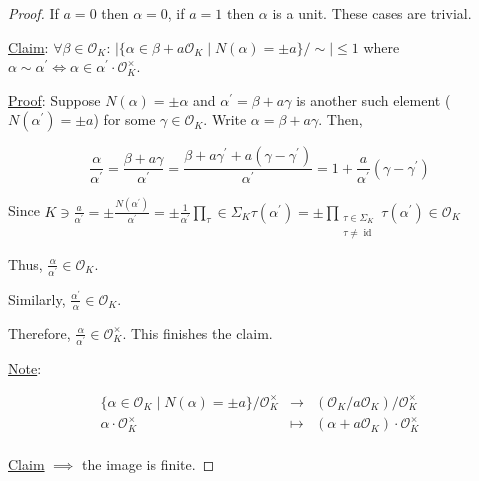 \documentclass[openany]{amsbook}
\numberwithin{section}{chapter}
\theoremstyle{definition}
\begin{document}
\begin{proof}
    If \(a = 0\) then \(\alpha = 0\), if \(a = 1\) then \(\alpha\) is a unit. These cases are trivial.

    \underline{Claim}: \(\forall \beta \in \mathcal{O}_K\): \(\left\vert \{ \alpha \in \beta + a \mathcal{O}_K \mid N(\alpha) = \pm a \} / \sim \right\vert \leq 1\) where \(\alpha \sim \alpha ^{\prime} \iff \alpha \in \alpha ^{\prime} \cdot \mathcal{O}_K^\times\). 

    \underline{Proof}: Suppose \(N(\alpha)=\pm \alpha\) and \(\alpha ^{\prime} = \beta + a \gamma \) is another such element (\(N(\alpha ^{\prime} ) = \pm a\)) for some \(\gamma \in \mathcal{O}_K\). Write \(\alpha = \beta + a \gamma\). Then, 
    
    \[
        \frac{\alpha}{\alpha ^{\prime}} = \frac{\beta + a \gamma}{\alpha ^{\prime} } = \frac{\beta + a \gamma ^{\prime} + a(\gamma -\gamma ^{\prime} )}{\alpha ^{\prime} } = 1 + \frac{a}{\alpha ^{\prime}} (\gamma - \gamma ^{\prime} )
    \]
    
    Since \(K\ni\frac{a}{\alpha ^{\prime} } = \pm \frac{N(\alpha^{\prime})}{\alpha ^{\prime}} = \pm \frac{1}{\alpha ^{\prime} } \prod_\tau \in \Sigma_K \tau(\alpha^{\prime}) = \pm \prod_{\substack{\tau \in \Sigma _K \\ \tau \neq \operatorname{id}}} \tau(\alpha ^{\prime}) \in \mathcal{O}_K\) 

    Thus, \(\frac{\alpha}{\alpha ^{\prime} } \in \mathcal{O}_K\).
    
    Similarly, \(\frac{\alpha^{\prime}}{\alpha} \in \mathcal{O}_K\).
    
    Therefore, \(\frac{\alpha}{\alpha^{\prime}} \in \mathcal{O}_K^\times\).  This finishes the claim.
    
    \underline{Note}:

    \[
        \begin{array}{rcl}
            \{ \alpha \in \mathcal{O}_K \mid N(\alpha) = \pm a \} / \mathcal{O} _K ^\times & \longrightarrow &  (\mathcal{O}_K / a \mathcal{O}_K) / \mathcal{O}_K ^\times \\
            \alpha \cdot \mathcal{O}_K ^\times & \longmapsto  &  (\alpha + a \mathcal{O}_K) \cdot \mathcal{O}_K ^\times  \\
        \end{array}
    \]

    \underline{Claim} \(\implies\) the image is finite.

\end{proof}
\end{document}

